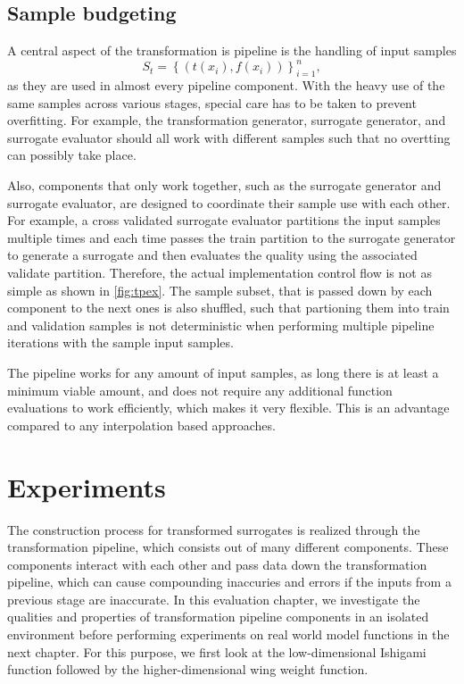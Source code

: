 \documentclass[
  a4paper,  %
  twoside,  %
  bibliography=totoc,
  headsepline,
  cleardoublepage=empty,
  parskip=half,
  draft=false
]{scrbook}
\begin{document}
\section{Sample budgeting}

A central aspect of the transformation is pipeline is the handling of input samples
\begin{equation}
S_t=\left\{(t(x_i), f(x_i))\right\}_{i=1}^n,
\nonumber
\end{equation}
as they are used in almost every pipeline component.
With the heavy use of the same samples across various stages, special care has to be taken to prevent overfitting.
For example, the transformation generator, surrogate generator, and surrogate evaluator should all work with different samples such that no overtting can possibly take place.

Also, components that only work together, such as the surrogate generator and surrogate evaluator, are designed to coordinate their sample use with each other.
For example, a cross validated surrogate evaluator partitions the input samples multiple times and each time passes the train partition to the surrogate generator to generate a surrogate and then evaluates the quality using the associated validate partition.
Therefore, the actual implementation control flow is not as simple as shown in \cref{fig:tpex}.
The sample subset, that is passed down by each component to the next ones is also shuffled, such that partioning them into train and validation samples is not deterministic when performing multiple pipeline iterations with the sample input samples.

The pipeline works for any amount of input samples, as long there is at least a minimum viable amount, and does not require any additional function evaluations to work efficiently, which makes it very flexible.
This is an advantage compared to any interpolation based approaches.

\chapter{Experiments}
\label{chap:c7}

The construction process for transformed surrogates is realized through the transformation pipeline, which consists out of many different components.
These components interact with each other and pass data down the transformation pipeline, which can cause compounding inaccuries and errors if the inputs from a previous stage are inaccurate.
In this evaluation chapter, we investigate the qualities and properties of transformation pipeline components in an isolated environment before performing experiments on real world model functions in the next chapter.
For this purpose, we first look at the low-dimensional Ishigami function followed by the higher-dimensional wing weight function.
\end{document}
